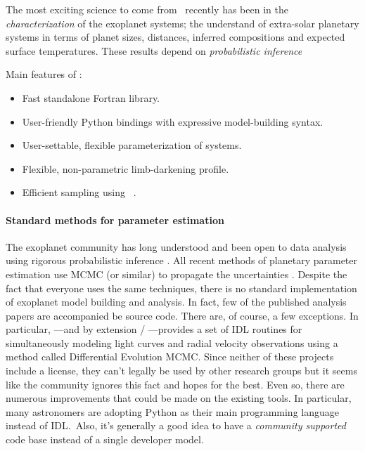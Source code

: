 \documentclass[letterpaper,12pt,preprint]{hack_aastex}
\newcommand{\Bart}{\package{Bart}}
\newcommand{\emcee}{\package{emcee}}
\begin{document}
The most exciting science to come from \Kepler\ recently has been in
the \emph{characterization} of the exoplanet systems; the understand
of extra-solar planetary systems in terms of planet sizes, distances,
inferred compositions and expected surface temperatures.  These
results depend on \emph{probabilistic inference}

Main features of \Bart:
\begin{itemize}
\item Fast standalone Fortran library.
\item User-friendly Python bindings with expressive model-building syntax.
\item User-settable, flexible parameterization of systems.
\item Flexible, non-parametric limb-darkening profile.
\item Efficient sampling using \emcee\ \citep{emcee}.
\end{itemize}

\paragraph{Standard methods for parameter estimation}
The exoplanet community has long understood and been open to data analysis
using rigorous probabilistic inference \citep[][for example]{ford}.
All recent methods of planetary parameter estimation use MCMC (or similar) to
propagate the uncertainties \citep[][to name only a few]{barclay,dressing,%
kepler5,kepler4}.
Despite the fact that everyone uses the same techniques, there is no standard
implementation of exoplanet model building and analysis.
In fact, few of the published analysis papers are accompanied be source code.
There are, of course, a few exceptions.
In particular,  \citep{exofast}---and by extension
/ \citep{autokep}---provides a set of IDL
routines for simultaneously modeling light curves and radial velocity
observations using a method called Differential Evolution MCMC.%
Since neither of these projects include a license, they can't legally be used
by other research groups but it seems like the community ignores this fact and
hopes for the best.
Even so, there are numerous improvements that could be made on the existing
tools.
In particular, many astronomers are adopting Python as their main programming
language instead of IDL.\
Also, it's generally a good idea to have a \emph{community supported} code
base instead of a single developer model.
\end{document}
